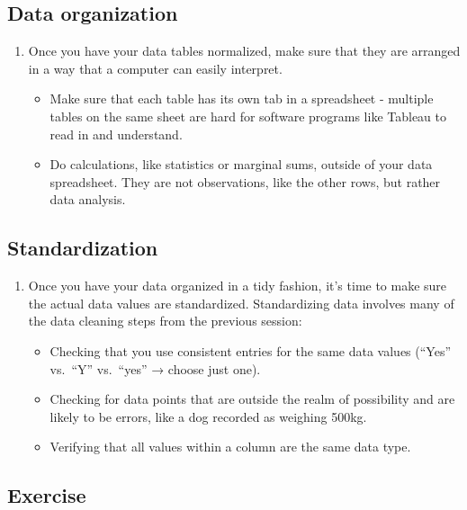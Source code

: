 \documentclass[
]{book}
\begin{document}
\hypertarget{data-organization}{%
\subsection{Data organization}\label{data-organization}}

\begin{enumerate}
\def\labelenumi{\arabic{enumi}.}
\item
  Once you have your data tables normalized, make sure that they are arranged in a way that a computer can easily interpret.

  \begin{itemize}
  \item
    Make sure that each table has its own tab in a spreadsheet - multiple tables on the same sheet are hard for software programs like Tableau to read in and understand.
  \item
    Do calculations, like statistics or marginal sums, outside of your data spreadsheet. They are not observations, like the other rows, but rather data analysis.
  \end{itemize}
\end{enumerate}

\hypertarget{standardization}{%
\subsection{Standardization}\label{standardization}}

\begin{enumerate}
\def\labelenumi{\arabic{enumi}.}
\item
  Once you have your data organized in a tidy fashion, it's time to make sure the actual data values are standardized. Standardizing data involves many of the data cleaning steps from the previous session:

  \begin{itemize}
  \item
    Checking that you use consistent entries for the same data values (``Yes'' vs.~``Y'' vs.~``yes'' → choose just one).
  \item
    Checking for data points that are outside the realm of possibility and are likely to be errors, like a dog recorded as weighing 500kg.
  \item
    Verifying that all values within a column are the same data type.
  \end{itemize}
\end{enumerate}

\hypertarget{exercise}{%
\subsection{Exercise}\label{exercise}}
\end{document}
